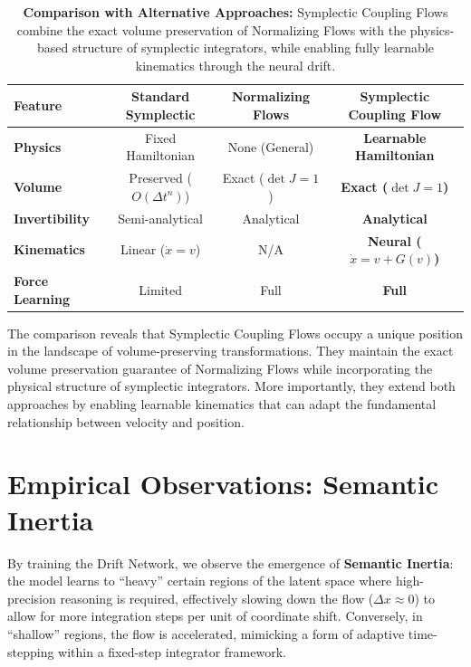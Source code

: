 \documentclass[12pt,a4paper]{article}
\DeclareMathOperator{\det}{det}
\begin{document}
\begin{table}[htbp]
\centering
\begin{tabular}{@{}lccc@{}}
\toprule
\textbf{Feature} & \textbf{Standard Symplectic} & \textbf{Normalizing Flows} & \textbf{Symplectic Coupling Flow} \\
\midrule
\textbf{Physics} & Fixed Hamiltonian & None (General) & \textbf{Learnable Hamiltonian} \\
\textbf{Volume} & Preserved ($O(\Delta t^n)$) & Exact ($\det J = 1$) & \textbf{Exact ($\det J = 1$)} \\
\textbf{Invertibility} & Semi-analytical & Analytical & \textbf{Analytical} \\
\textbf{Kinematics} & Linear ($\dot{x}=v$) & N/A & \textbf{Neural ($\dot{x}=v+G(v)$)} \\
\textbf{Force Learning} & Limited & Full & \textbf{Full} \\
\bottomrule
\end{tabular}
\caption{\textbf{Comparison with Alternative Approaches:} Symplectic Coupling 
         Flows combine the exact volume preservation of Normalizing Flows 
         with the physics-based structure of symplectic integrators, while 
         enabling fully learnable kinematics through the neural drift.}
\label{tab:comparison}
\end{table}

The comparison reveals that Symplectic Coupling Flows occupy a unique position in the landscape of volume-preserving transformations. They maintain the exact volume preservation guarantee of Normalizing Flows while incorporating the physical structure of symplectic integrators. More importantly, they extend both approaches by enabling learnable kinematics that can adapt the fundamental relationship between velocity and position.

\section{Empirical Observations: Semantic Inertia}

By training the Drift Network, we observe the emergence of \textbf{Semantic Inertia}: the model learns to ``heavy'' certain regions of the latent space where high-precision reasoning is required, effectively slowing down the flow ($\Delta x \approx 0$) to allow for more integration steps per unit of coordinate shift. Conversely, in ``shallow'' regions, the flow is accelerated, mimicking a form of adaptive time-stepping within a fixed-step integrator framework.
\end{document}
